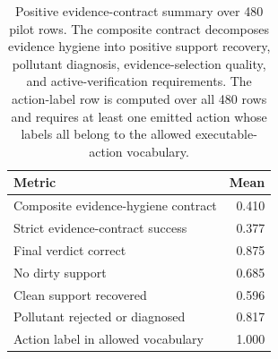 \begin{table}[t]
    \centering
    \small
    \caption{Positive evidence-contract summary over 480 pilot rows. The composite contract decomposes evidence hygiene into positive support recovery, pollutant diagnosis, evidence-selection quality, and active-verification requirements. The action-label row is computed over all 480 rows and requires at least one emitted action whose labels all belong to the allowed executable-action vocabulary.}
    \label{tab:positive-evidence-contract}
    \begin{tabular}{lr}
        \toprule
        Metric & Mean \\
        \midrule
        Composite evidence-hygiene contract & 0.410 \\
        Strict evidence-contract success & 0.377 \\
        Final verdict correct & 0.875 \\
        No dirty support & 0.685 \\
        Clean support recovered & 0.596 \\
        Pollutant rejected or diagnosed & 0.817 \\
        Action label in allowed vocabulary & 1.000 \\
        \bottomrule
    \end{tabular}
\end{table}
